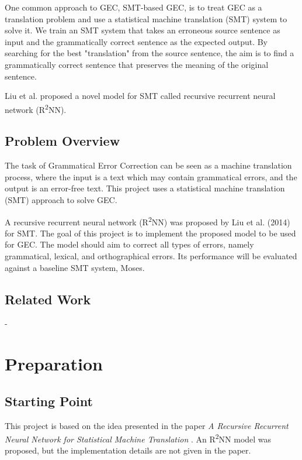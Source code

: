 \documentclass[12pt,a4paper,twoside,openright]{report}
\begin{document}
One common approach to GEC, SMT-based GEC, is to treat GEC as a translation problem and use a statistical machine translation (SMT) system to solve it. We train an SMT system that takes an erroneous source sentence as input and the grammatically correct sentence as the expected output. By searching for the best "translation" from the source sentence, the aim is to find a grammatically correct sentence that preserves the meaning of the original sentence.

Liu et al. proposed a novel model for SMT called recursive recurrent neural network (R\textsuperscript{2}NN)\cite{r2nn}.



\section{Problem Overview}

The task of Grammatical Error Correction can be seen as a machine translation process, where the input is a text which may contain grammatical errors, and the output is an error-free text. This project uses a statistical machine translation (SMT) approach to solve GEC.

A recursive recurrent neural network (R\textsuperscript{2}NN) was proposed by Liu et al. (2014) \cite{r2nn} for SMT. The goal of this project is to implement the proposed model to be used for GEC. The model should aim to correct all types of errors, namely grammatical, lexical, and orthographical errors. Its performance will be evaluated against a baseline SMT system, Moses\cite{moses}.


\section{Related Work}
-

\chapter{Preparation}

\section{Starting Point}

This project is based on the idea presented in the paper \textit{A Recursive Recurrent Neural Network for Statistical Machine Translation} \cite{r2nn}. An R\textsuperscript{2}NN model was proposed, but the implementation details are not given in the paper.
\end{document}
